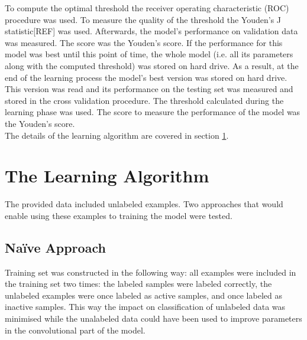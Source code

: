 \documentclass[a4paper,10pt]{report}
\begin{document}
	To compute the optimal threshold the receiver operating characteristic (ROC) procedure was used. To measure the quality of the threshold the Youden's J statistic[REF] was used. Afterwards, the model's performance on validation data was measured. The score was the Youden's score. If the performance for this model was best until this point of time, the whole model (i.e. all its parameters along with the computed threshold) was stored on hard drive. As a result, at the end of the learning process the model's best version was stored on hard drive. This version was read and its performance on the testing set was measured and stored in the cross validation procedure. The threshold calculated during the learning phase was used. The score to measure the performance of the model was the Youden's score.\\
	
	The details of the learning algorithm are covered in section \ref{sec:learning_algorithm}.	
	
      
    \section{The Learning Algorithm}\label{sec:learning_algorithm} 
    The provided data included unlabeled examples. Two approaches that would enable using these examples to training the model were tested.\\
    
      \subsection{Na\"{i}ve Approach}
      Training set was constructed in the following way: all examples were included in the training set two times: the labeled samples were labeled correctly, the unlabeled examples were once labeled as active samples, and once labeled as inactive samples. This way the impact on classification of unlabeled data was minimised while the unalabeled data could have been used to improve parameters in the convolutional part of the model.\\
	  
\end{document}
